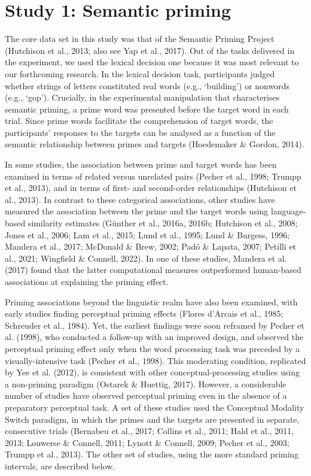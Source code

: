 \documentclass[
  12pt,
  man,floatsintext]{apa7}
\begin{document}
\hypertarget{study-1-semantic-priming}{%
\section{Study 1: Semantic priming}\label{study-1-semantic-priming}}

The core data set in this study was that of the Semantic Priming Project (Hutchison et al., 2013; also see Yap et al., 2017). Out of the tasks delivered in the experiment, we used the lexical decision one because it was most relevant to our forthcoming research. In the lexical decision task, participants judged whether strings of letters constituted real words (e.g., `building') or nonwords (e.g., `gop'). Crucially, in the experimental manipulation that characterises semantic priming, a prime word was presented before the target word in each trial. Since prime words facilitate the comprehension of target words, the participants' responses to the targets can be analysed as a function of the semantic relationship between primes and targets (Hoedemaker \& Gordon, 2014).

In some studies, the association between prime and target words has been examined in terms of related versus unrelated pairs (Pecher et al., 1998; Trumpp et al., 2013), and in terms of first- and second-order relationships (Hutchison et al., 2013). In contrast to these categorical associations, other studies have measured the association between the prime and the target words using language-based similarity estimates (Günther et al., 2016a, 2016b; Hutchison et al., 2008; Jones et al., 2006; Lam et al., 2015; Lund et al., 1995; Lund \& Burgess, 1996; Mandera et al., 2017; McDonald \& Brew, 2002; Padó \& Lapata, 2007; Petilli et al., 2021; Wingfield \& Connell, 2022). In one of these studies, Mandera et al. (2017) found that the latter computational measures outperformed human-based associations at explaining the priming effect.

Priming associations beyond the linguistic realm have also been examined, with early studies finding perceptual priming effects (Flores d'Arcais et al., 1985; Schreuder et al., 1984). Yet, the earliest findings were soon reframed by Pecher et al. (1998), who conducted a follow-up with an improved design, and observed the perceptual priming effect only when the word processing task was preceded by a visually-intensive task (Pecher et al., 1998). This moderating condition, replicated by Yee et al. (2012), is consistent with other conceptual-processing studies using a non-priming paradigm (Ostarek \& Huettig, 2017). However, a considerable number of studies have observed perceptual priming even in the absence of a preparatory perceptual task. A set of these studies used the Conceptual Modality Switch paradigm, in which the primes and the targets are presented in separate, consecutive trials (Bernabeu et al., 2017; Collins et al., 2011; Hald et al., 2011, 2013; Louwerse \& Connell, 2011; Lynott \& Connell, 2009; Pecher et al., 2003; Trumpp et al., 2013). The other set of studies, using the more standard priming intervals, are described below.
\end{document}
